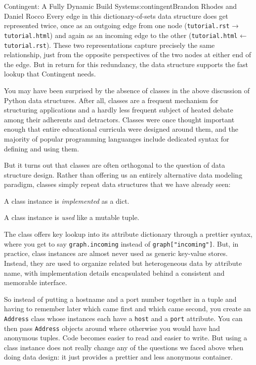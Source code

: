 \begin{aosachapter}{Contingent: A Fully Dynamic Build System}{s:contingent}{Brandon Rhodes and Daniel Rocco}
Every edge in this dictionary-of-sets data structure does get
represented twice, once as an outgoing edge from one node
(\texttt{tutorial.rst} → \texttt{tutorial.html}) and again as an
incoming edge to the other (\texttt{tutorial.html} ←
\texttt{tutorial.rst}). These two representations capture precisely the
same relationship, just from the opposite perspectives of the two nodes
at either end of the edge. But in return for this redundancy, the data
structure supports the fast lookup that Contingent needs.

\label{the-proper-use-of-classes}

You may have been surprised by the absence of classes in the above
discussion of Python data structures. After all, classes are a frequent
mechanism for structuring applications and a hardly less frequent
subject of heated debate among their adherents and detractors. Classes
were once thought important enough that entire educational curricula
were designed around them, and the majority of popular programming
languanges include dedicated syntax for defining and using them.

But it turns out that classes are often orthogonal to the question of
data structure design. Rather than offering us an entirely alternative
data modeling paradigm, classes simply repeat data structures that we
have already seen:

\begin{aosaitemize}

\item
  A class instance is \emph{implemented} as a dict.
\item
  A class instance is \emph{used} like a mutable tuple.
\end{aosaitemize}

The class offers key lookup into its attribute dictionary through a
prettier syntax, where you get to say \texttt{graph.incoming} instead of
\texttt{graph{[}"incoming"{]}}. But, in practice, class instances are
almost never used as generic key-value stores. Instead, they are used to
organize related but heterogeneous data by attribute name, with
implementation details encapsulated behind a consistent and memorable
interface.

So instead of putting a hostname and a port number together in a tuple
and having to remember later which came first and which came second, you
create an \texttt{Address} class whose instances each have a
\texttt{host} and a \texttt{port} attribute. You can then pass
\texttt{Address} objects around where otherwise you would have had
anonymous tuples. Code becomes easier to read and easier to write. But
using a class instance does not really change any of the questions we
faced above when doing data design: it just provides a prettier and less
anonymous container.


\end{aosachapter}
